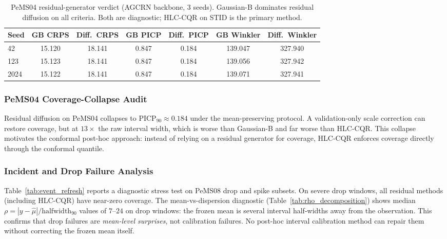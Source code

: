 \documentclass[letterpaper,journal]{IEEEtran}
\begin{document}
\begin{table}[t]
\centering
\caption{PeMS04 residual-generator verdict (AGCRN backbone, 3 seeds).
Gaussian-B dominates residual diffusion on all criteria.  Both are
diagnostic; HLC-CQR on STID is the primary method.}
\label{tab:pems04_residual_verdict}
\scriptsize
\setlength{\tabcolsep}{2pt}
\begin{tabular}{@{}lcccccc@{}}
\toprule
Seed & GB CRPS & Diff.\ CRPS & GB PICP & Diff.\ PICP & GB Winkler & Diff.\ Winkler \\
\midrule
42   & 15.120 & 18.141 & 0.847 & 0.184 & 139.047 & 327.940 \\
123  & 15.123 & 18.141 & 0.847 & 0.184 & 139.056 & 327.942 \\
2024 & 15.122 & 18.141 & 0.847 & 0.184 & 139.071 & 327.941 \\
\bottomrule
\end{tabular}
\end{table}

\subsubsection{PeMS04 Coverage-Collapse Audit}
Residual diffusion on PeMS04 collapses to $\text{PICP}_{90}\approx0.184$
under the mean-preserving protocol.  A validation-only scale correction
can restore coverage, but at $13\times$ the raw interval width, which is
worse than Gaussian-B and far worse than HLC-CQR.  This collapse motivates
the conformal post-hoc approach: instead of relying on a residual generator
for coverage, HLC-CQR enforces coverage directly through the conformal
quantile.

\subsubsection{Incident and Drop Failure Analysis}
Table~\ref{tab:event_refresh} reports a diagnostic stress test on PeMS08
drop and spike subsets.  On severe drop windows, all residual methods
(including HLC-CQR) have near-zero coverage.  The mean-vs-dispersion
diagnostic (Table~\ref{tab:rho_decomposition}) shows median
$\rho=|y-\hat{\mu}|/\text{halfwidth}_{90}$ values of $7$--$24$ on drop
windows: the frozen mean is several interval half-widths away from the
observation.  This confirms that drop failures are \emph{mean-level
surprises}, not calibration failures.  No post-hoc interval calibration
method can repair them without correcting the frozen mean itself.
\end{document}
